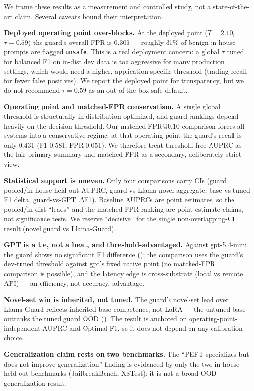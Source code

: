 \documentclass[sigconf,nonacm]{acmart}
\begin{document}
We frame these results as a measurement and controlled study, not a state-of-the-art claim. Several caveats bound their interpretation.

\textbf{Deployed operating point over-blocks.} At the deployed point ($T=2.10$, $\tau=0.59$) the guard's overall FPR is 0.306 --- roughly 31\% of benign in-house prompts are flagged \texttt{unsafe}. This is a real deployment concern: a global $\tau$ tuned for balanced F1 on in-dist dev data is too aggressive for many production settings, which would need a higher, application-specific threshold (trading recall for fewer false positives). We report the deployed point for transparency, but we do not recommend $\tau=0.59$ as an out-of-the-box safe default.

\textbf{Operating point and matched-FPR conservatism.} A single global threshold is structurally in-distribution-optimized, and guard rankings depend heavily on the decision threshold. Our matched-FPR@0.10 comparison forces all systems into a conservative regime: at that operating point the guard's recall is only 0.431 (F1 0.581, FPR 0.051). We therefore treat threshold-free AUPRC as the fair primary summary and matched-FPR as a secondary, deliberately strict view.

\textbf{Statistical support is uneven.} Only four comparisons carry CIs (guard pooled/in-house-held-out AUPRC, guard-vs-Llama novel aggregate, base-vs-tuned F1 delta, guard-vs-GPT $\Delta$F1). Baseline AUPRCs are point estimates, so the pooled/in-dist ``leads'' and the matched-FPR ranking are point-estimate claims, not significance tests. We reserve ``decisive'' for the single non-overlapping-CI result (novel guard vs Llama-Guard).

\textbf{GPT is a tie, not a beat, and threshold-advantaged.} Against gpt-5.4-mini the guard shows no significant F1 difference (); the comparison uses the guard's dev-tuned threshold against gpt's fixed native point (no matched-FPR comparison is possible), and the latency edge is cross-substrate (local vs remote API) --- an efficiency, not accuracy, advantage.

\textbf{Novel-set win is inherited, not tuned.} The guard's novel-set lead over Llama-Guard reflects inherited base competence, not LoRA --- the untuned base outranks the tuned guard OOD (). The result is anchored on operating-point-independent AUPRC and Optimal-F1, so it does not depend on any calibration choice.

\textbf{Generalization claim rests on two benchmarks.} The ``PEFT specializes but does not improve generalization'' finding is evidenced by only the two in-house held-out benchmarks (JailbreakBench, XSTest); it is not a broad OOD-generalization result.
\end{document}
